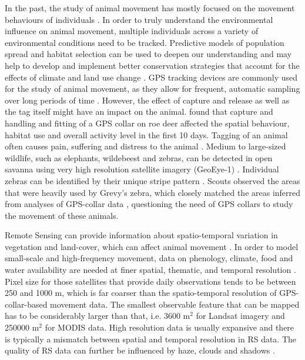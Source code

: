 \documentclass[12pt,a4paper, twoside, english]{article}
\begin{document}
In the past, the study of animal movement has mostly focused on the movement behaviours of individuals \citep{Fryxell2008, Nathan2008}. In order to truly understand the environmental influence on animal movement, multiple individuals across a variety of environmental conditions need to be tracked. Predictive models of population spread and habitat selection can be used to deepen our understanding and may help to develop and implement better conservation strategies that account for the effects of climate and land use change \citep{Avgar2013, Naidoo2012}. GPS tracking devices are commonly used for the study of animal movement, as they allow for frequent, automatic sampling over long periods of time \citep{Bjorneraas2010}. However, the effect of capture and release as well as the tag itself might have an impact on the animal. \cite{Morellet2009} found that capture and handling and fitting of a GPS collar on roe deer affected the spatial behaviour, habitat use and overall activity level in the first 10 days. Tagging of an animal often causes pain, suffering and distress to the animal \citep{Hawkins2004}. Medium to large-sized wildlife, such as elephants, wildebeest and zebras, can be detected in open savanna using very high resolution satellite imagery (GeoEye-1) \citep{Pettorelli2014}. Individual zebras can be identified by their unique stripe pattern \citep{Grubb1981}. Scouts observed the areas that were heavily used by Grevy's zebra, which closely matched the areas inferred from analyses of GPS-collar data \citep{Low2009}, questioning the need of GPS collars to study the movement of these animals.


Remote Sensing can provide information about spatio-temporal variation in vegetation and land-cover, which can affect animal movement \citep{Pettorelli2014}. In order to model small-scale and high-frequency movement, data on phenology, climate, food and water availability are needed at finer spatial, thematic, and temporal resolution \citep{Rose2015}. Pixel size for those satellites that provide daily observations tends to be between 250 and 1000 m, which is far coarser than the spatio-temporal resolution of GPS-collar-based movement data. The smallest observable feature that can be mapped has to be considerably larger than that, i.e. 3600 m$^{2}$ for Landsat imagery and 250000 m$^{2}$ for MODIS data. High resolution data is usually expansive and there is typically a mismatch between spatial and temporal resolution in RS data. The quality of RS data can further be influenced by haze, clouds and shadows \citep{Willis2015, Zeller2012, Neumann2015a}. 
\end{document}
